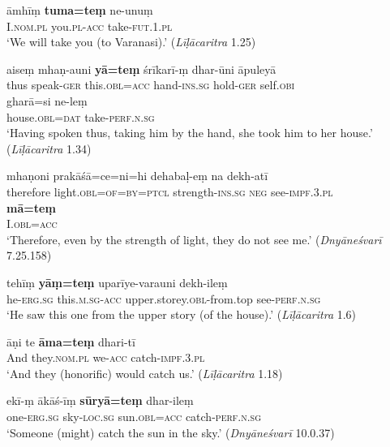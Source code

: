 \documentclass[output=paper,
modfonts
]{LSP/langsci}
\begin{document}
\begin{exe}
\ex\label{take}
\begin{xlist}
\ex\gll āmhīṃ \textbf{tuma=teṃ} ne-unuṃ \\
I.\textsc{nom.pl} you.\textsc{pl-acc} take-\textsc{fut.1.pl} \\ 
\glt `We will take you (to Varanasi).'   (\textit{Līḷācaritra} 1.25)

\ex\gll aiseṃ  mhaṇ-auni  \textbf{yā=teṃ}  śrīkarī-ṃ  dhar-ūni  āpuleyā  \\
thus speak-\textsc{ger} this.\textsc{obl=acc} hand-\textsc{ins.sg} hold-\textsc{ger} self.\textsc{obi} \\

\gll gharā=si  ne-leṃ \\
house.\textsc{obl=dat} take-\textsc{perf.n.sg} \\
\glt `Having spoken thus, taking him by the hand, she took him to her house.' (\textit{Līḷācaritra} 1.34) 
\end{xlist}



 

\ex\label{dekh}
\begin{xlist}
	\ex\gll mhaṇoni prakāśā=ce=ni=hi dehabaḷ-eṃ na dekh-atī \\
therefore light.\textsc{obl=of=by=ptcl} strength-\textsc{ins.sg} \textsc{neg} see-\textsc{impf.3.pl} \\

\gll \textbf{mā=teṃ} \\
I.\textsc{obl=acc} \\
\glt `Therefore, even by the strength of light, they do not see me.' (\textit{Dnyāneśvarī} 7.25.158)

\ex\gll tehīṃ  \textbf{yāṃ=teṃ}  uparīye-varauni  dekh-ileṃ \\ he-\textsc{erg.sg} this.\textsc{m.sg-acc}      upper.storey.\textsc{obl}-from.top see-\textsc{perf.n.sg} \\
\glt `He saw this one from the upper story (of the house).' (\textit{Līḷācaritra } 1.6)
\end{xlist}

\ex\label{dhar}
\begin{xlist}
\ex\gll āṇi te  \textbf{āma=teṃ } dhari-tī \\
And they.\textsc{nom.pl} we-\textsc{acc} catch-\textsc{impf.3.pl} \\ \glt `And they (honorific) would catch us.' (\textit{Līḷācaritra} 1.18)

\ex\gll ekī-ṃ ākāś-īṃ \textbf{sūryā=teṃ} dhar-ileṃ \\ one-\textsc{erg.sg} sky-\textsc{loc.sg} sun.\textsc{obl=acc} catch-\textsc{perf.n.sg} \\
\glt `Someone (might) catch  the sun in the sky.'  (\textit{Dnyāneśvarī} 10.0.37)
\end{xlist}
\end{exe}
 
\end{document}
